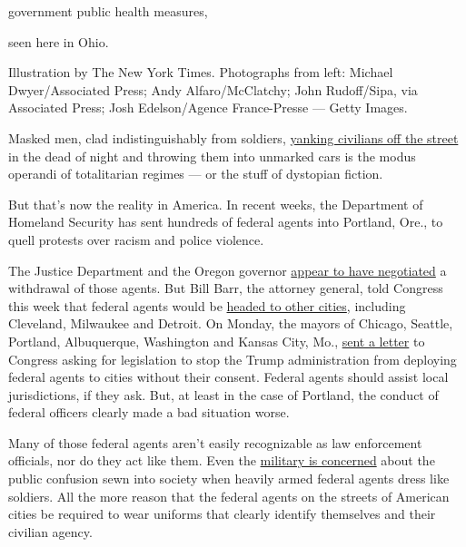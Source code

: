 government public health measures,

seen here in Ohio.

Illustration by The New York Times. Photographs from left: Michael
Dwyer/Associated Press; Andy Alfaro/McClatchy; John Rudoff/Sipa, via
Associated Press; Josh Edelson/Agence France-Presse --- Getty Images.

Masked men, clad indistinguishably from soldiers,
\href{https://www.nytimes.com/2020/07/17/us/politics/federal-agents-portland-arrests.html}{yanking
civilians off the street} in the dead of night and throwing them into
unmarked cars is the modus operandi of totalitarian regimes --- or the
stuff of dystopian fiction.

But that's now the reality in America. In recent weeks, the Department
of Homeland Security has sent hundreds of federal agents into Portland,
Ore., to quell protests over racism and police violence.

The Justice Department and the Oregon governor
\href{https://www.nytimes.com/2020/07/29/us/protests-portland-federal-withdrawal.html?action=click\&module=Top\%20Stories\&pgtype=Homepage}{appear
to have negotiated} a withdrawal of those agents. But Bill Barr, the
attorney general, told Congress this week that federal agents would be
\href{https://www.nytimes.com/reuters/2020/07/29/us/politics/29reuters-global-race-protests.html}{headed
to other cities}, including Cleveland, Milwaukee and Detroit. On Monday,
the mayors of Chicago, Seattle, Portland, Albuquerque, Washington and
Kansas City, Mo.,
\href{https://www.npr.org/sections/live-updates-protests-for-racial-justice/2020/07/27/895904023/mayors-demand-congress-block-trump-from-deploying-federal-agents-to-cities}{sent
a letter} to Congress asking for legislation to stop the Trump
administration from deploying federal agents to cities without their
consent. Federal agents should assist local jurisdictions, if they ask.
But, at least in the case of Portland, the conduct of federal officers
clearly made a bad situation worse.

Many of those federal agents aren't easily recognizable as law
enforcement officials, nor do they act like them. Even the
\href{https://www.washingtonpost.com/national-security/2020/07/22/cbp-military-camouflage-uniforms/}{military
is concerned} about the public confusion sewn into society when heavily
armed federal agents dress like soldiers. All the more reason that the
federal agents on the streets of American cities be required to wear
uniforms that clearly identify themselves and their civilian agency.

